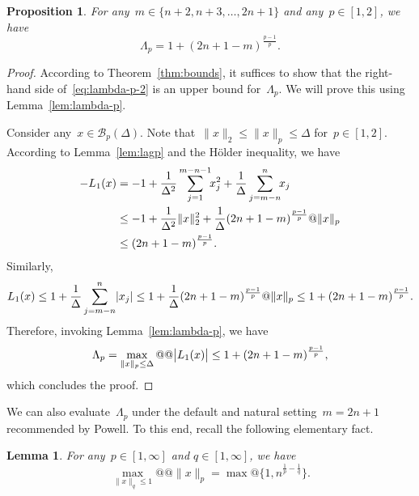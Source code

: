 \documentclass{article}
\numberwithin{equation}{section}
\theoremstyle{definition}
\theoremstyle{plain}
\newtheorem{proposition}{Proposition}[section]
\newtheorem{lemma}{Lemma}[section]
\theoremstyle{remark}
\newcommand*{\abs}[2][]{#1\lvert#2#1\rvert}
\newcommand*{\norm}[2][]{#1\lVert#2#1\rVert}
\newcommand*{\set}[2][]{#1\{#2#1\}}
\newcommand*{\lagp}[1][]{L\ifblank{#1}{}{_{#1}}}
\begin{document}
\begin{proposition}
    \label{prop:lambda-p-2}
    For any~$m \in \set{n + 2, n + 3, \dots, 2n + 1}$ and any~$p \in[1, 2]$, we have
    \begin{equation}
        \label{eq:lambda-p-2}
        \Lambda_p = 1 + (2n + 1 - m)^{\frac{p - 1}{p}}.
    \end{equation}
\end{proposition}

\begin{proof}
    According to Theorem~\ref{thm:bounds}, it suffices to show that the right-hand side of~\eqref{eq:lambda-p-2} is an upper bound for~$\Lambda_p$.
    We will prove this using Lemma~\ref{lem:lambda-p}.

    Consider any~$x \in \mathcal{B}_p(\Delta)$.
    Note that~$\norm{x}_2 \le\norm{x}_p \le \Delta $ for~$p\in[1, 2]$.
    According to Lemma~\ref{lem:lagp} and the H{\"{o}}lder inequality, we have
    \begin{align*}
        -\lagp[1](x)    &= -1 + \frac{1}{\Delta^2} \sum_{j = 1}^{m - n - 1} \!\! x_j^2 + \frac{1}{\Delta} \sum_{j = m - n}^n \!\! x_j\\
                        &\le -1 + \frac{1}{\Delta^2}\norm{x}_2^2 + \frac{1}{\Delta} (2n+1-m)^{\frac{p-1}{p}} @ \norm{x}_p\\
                        &\le (2n+1-m)^{\frac{p-1}{p}}.
    \end{align*}
    Similarly,
    \begin{equation*}
        \lagp[1](x) \le 1 + \frac{1}{\Delta}\sum_{j = m - n}^n \abs{x_j} \le 1 + \frac{1}{\Delta} (2n + 1 - m)^{\frac{p-1}{p}} @ \norm{x}_p \le 1 + (2n + 1 - m)^{\frac{p - 1}{p}}.
    \end{equation*}
    Therefore, invoking Lemma~\ref{lem:lambda-p}, we have
    \begin{equation*}
        \Lambda_p = \max_{\norm{x}_p \le \Delta} @@ \abs[\big]{\lagp[1](x)} \le 1 + (2n + 1 - m)^{\frac{p - 1}{p}},
    \end{equation*}
    which concludes the proof.
\end{proof}

We can also evaluate~$\Lambda_p$ under the default and natural setting~$m = 2n + 1$ recommended by Powell.
To this end, recall the following elementary fact.

\begin{lemma}
    \label{lem:max-norm-pq}
    For any~$p \in [1, \infty]$ and $q \in [1, \infty]$, we have
    \begin{equation}
        \label{eq:max-norm-pq}
        \max_{\norm{x}_q \le 1} @@ \norm{x}_p = \max @ \set{1, n^{\frac{1}{p} - \frac{1}{q}}}.
    \end{equation}
\end{lemma}
\end{document}
